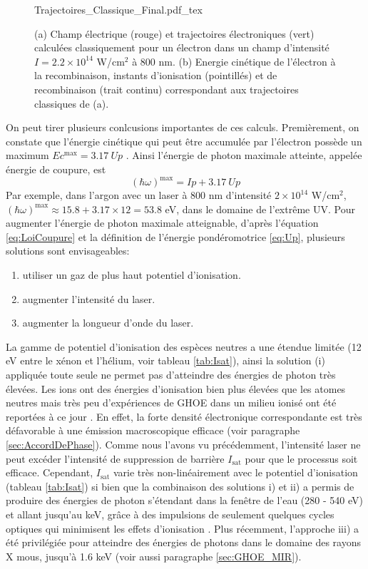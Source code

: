 \begin{figure}
\centering
\def\svgwidth{0.6\columnwidth}
{Trajectoires_Classique_Final.pdf_tex}
\caption{(a) Champ électrique (rouge) et trajectoires électroniques (vert) calculées classiquement pour un électron dans un champ d'intensité $I = 2.2 \times 10^{14}$  W/cm$^2$ à 800 nm. (b) Energie cinétique de l'électron à la recombinaison, instants d'ionisation (pointillés) et de recombinaison (trait continu) correspondant aux trajectoires classiques de (a).}
\label{fig:traj_class}
\end{figure}

On peut tirer plusieurs conlcusions importantes de ces calculs. Premièrement, on constate que l'énergie cinétique qui peut être accumulée par l'électron possède un maximum $Ec^{\text{max}} = 3.17 \: Up$ . Ainsi l'énergie de photon maximale atteinte, appelée énergie de coupure, est
\begin{equation}
(\hbar \omega)^{\text{max}} = Ip + 3.17 \: Up
\label{eq:LoiCoupure}
\end{equation}
Par exemple, dans l'argon avec un laser à 800 nm d'intensité $2 \times 10^{14}$ W/cm$^2$, $(\hbar \omega)^{\text{max}} \approx 15.8 + 3.17 \times 12 = 53.8$ eV, dans le domaine de l'extrême UV. Pour augmenter l'énergie de photon maximale atteignable, d'après l'équation \ref{eq:LoiCoupure} et la définition de l'énergie pondéromotrice \ref{eq:Up}, plusieurs solutions sont envisageables:
\begin{enumerate}[label=\roman*)]
\item utiliser un gaz de plus haut potentiel d'ionisation.
\item augmenter l'intensité du laser.
\item augmenter la longueur d'onde du laser.
\end{enumerate}
La gamme de potentiel d'ionisation des espèces neutres a une étendue limitée (12 eV entre le xénon et l'hélium, voir tableau \ref{tab:Isat}), ainsi la solution (i) appliquée toute seule ne permet pas d'atteindre des énergies de photon très élevées. Les ions ont des énergies d'ionisation bien plus élevées que les atomes neutres mais très peu d'expériences de GHOE dans un milieu ionisé ont été reportées à ce jour . En effet, la forte densité électronique correspondante est très défavorable à une émission macroscopique efficace (voir paragraphe \ref{sec:AccordDePhase}). Comme nous l'avons vu précédemment, l'intensité laser ne peut excéder l'intensité de suppression de barrière $I_{\text{sat}}$ pour que le processus soit efficace. Cependant, $I_{\text{sat}}$ varie très non-linéairement avec le potentiel d'ionisation (tableau \ref{tab:Isat}) si bien que la combinaison des solutions i) et ii) a permis de produire des énergies de photon s'étendant dans la fenêtre de l'eau (280 - 540 eV) et allant jusqu'au keV, grâce à des impulsions de seulement quelques cycles optiques qui minimisent les effets d'ionisation . Plus récemment, l'approche iii) a été privilégiée pour atteindre des énergies de photons dans le domaine des rayons X mous, jusqu'à 1.6 keV  (voir aussi paragraphe \ref{sec:GHOE_MIR}).

